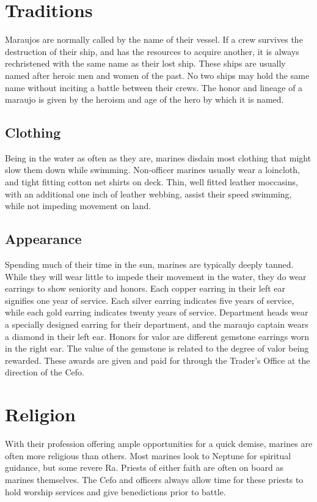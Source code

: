 \section{Traditions}

Maraujos are normally called by the name of their vessel. If a crew survives the destruction of their ship, and has the resources to acquire another, it is always rechristened with the same name as their lost ship. These ships are usually named after heroic men and women of the past. No two ships may hold the same name without inciting a battle between their crews. The honor and lineage of a maraujo is given by the heroism and age of the hero by which it is named.

\subsection{Clothing}

Being in the water as often as they are, marines disdain most clothing that might slow them down while swimming. Non-officer marines usually wear a loincloth, and tight fitting cotton net shirts on deck. Thin, well fitted leather moccasins, with an additional one inch of leather webbing,
assist their speed swimming, while not impeding movement on land.

\subsection{Appearance}

Spending much of their time in the sun, marines are typically deeply tanned. While they will wear little to impede their movement in the water, they do wear earrings to show seniority and honors. Each copper earring in their left ear signifies one year of service. Each silver earring indicates five years of service, while each gold earring indicates twenty years of service. Department heads wear a specially designed earring for their department, and the maraujo captain wears a diamond in their left ear. Honors for valor are different gemstone earrings worn in the right ear. The value of the gemstone is related to the degree of valor being rewarded. These awards are given and paid for through the Trader’s Office at the direction of the Cefo.

\section{Religion}

With their profession offering ample opportunities for a quick demise, marines are often more religious than others. Most marines look to Neptune for spiritual guidance, but some revere Ra. Priests of either faith are often on board as marines themselves. The Cefo and officers always allow time for these priests to hold worship services and give benedictions prior to battle.

